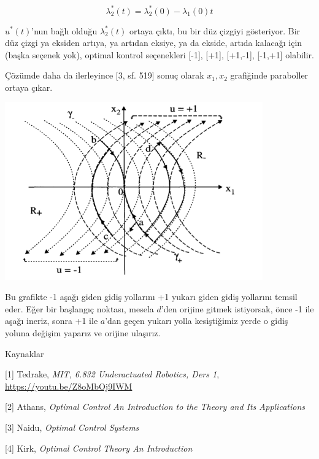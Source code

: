 \documentclass[12pt,fleqn]{article}\usepackage{../../common}
\begin{document}
$$
\lambda_2^*(t) = \lambda_2^*(0) - \lambda_1(0) t
$$

$u^*(t)$'nun bağlı olduğu $\lambda_2^*(t)$ ortaya çıktı, bu bir düz çizgiyi
gösteriyor. Bir düz çizgi ya eksiden artıya, ya artıdan eksiye, ya da
ekside, artıda kalacağı için (başka seçenek yok), optimal kontrol
seçenekleri [-1], [+1], [+1,-1], [-1,+1] olabilir.

Çözümde daha da ilerleyince [3, sf. 519] sonuç olarak $x_1,x_2$
grafiğinde paraboller ortaya çıkar.

\includegraphics[width=30em]{phy_control_07.png}

Bu grafikte -1 aşağı giden gidiş yollarını +1 yukarı giden gidiş
yollarını temsil eder. Eğer bir başlangıç noktası, mesela $d$'den
orijine gitmek istiyorsak, önce -1 ile aşağı ineriz, sonra +1 ile
$a$'dan geçen yukarı yolla kesiştiğimiz yerde o gidiş yoluna değişim
yaparız ve orijine ulaşırız.

Kaynaklar

[1] Tedrake, {\em MIT, 6.832 Underactuated Robotics, Ders 1}, \url{https://youtu.be/Z8oMbOj9IWM}

[2] Athans, {\em Optimal Control An Introduction to the Theory and Its Applications}

[3] Naidu, {\em Optimal Control Systems}

[4] Kirk, {\em Optimal Control Theory An Introduction}
\end{document}
